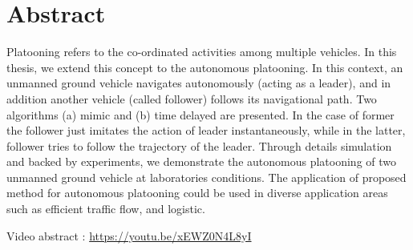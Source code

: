 \chapter*{Abstract}

Platooning  refers to the co-ordinated activities among multiple vehicles. In this thesis, we extend this concept to the autonomous platooning. In this context, an unmanned ground vehicle navigates autonomously (acting as a leader), and in addition another vehicle (called follower) follows its navigational path. Two algorithms (a) mimic and (b) time delayed are presented. In the case of former the follower just imitates the action of leader instantaneously, while in the latter, follower tries to follow the trajectory of the leader. Through details simulation and backed by experiments, we demonstrate the autonomous platooning of two unmanned ground vehicle at laboratories conditions. The application of proposed method for autonomous platooning could be used in diverse application areas such as efficient traffic flow, and logistic.

Video abstract : \url{https://youtu.be/xEWZ0N4L8yI}

\iffalse


Platooning  refers to the co-ordinated activities among multiple vehicles. In this thesis, we extend this concept to the autonomous platooning. In this context, an unmanned ground vehicle navigates autonomously (acting as a leader), and in addition another vehicle (called follower) follows its navigational path. Two algorithms (a) mimic and (b) time delayed are presented. In the case of former the follower just imitates the action of leader instantaneously, while in the latter, follower tries to follow the trajectory of the leader. Through details simulation and backed by experiments, we demonstrate the successful autonomous platooning of two unmanned ground vehicle at laboratories conditions. The application of proposed method for autonomous platooning could be used in diverse application areas such as efficient traffic flow, and logistic.
\fi